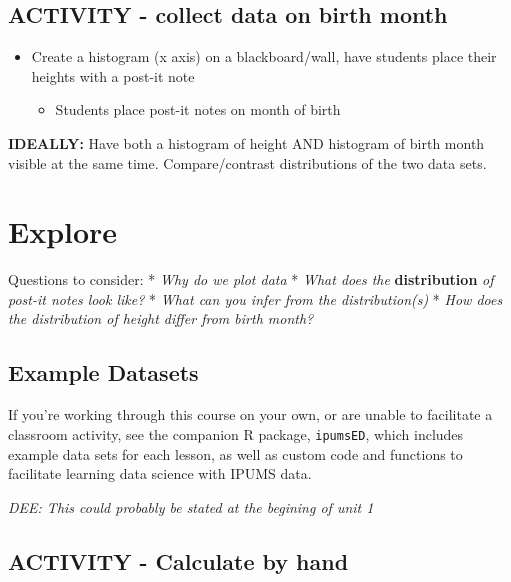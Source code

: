 \documentclass[
]{book}
\providecommand{\tightlist}{%
  \setlength{\itemsep}{0pt}\setlength{\parskip}{0pt}}
\begin{document}
\hypertarget{activity---collect-data-on-birth-month}{%
\subsection{ACTIVITY - collect data on birth month}\label{activity---collect-data-on-birth-month}}

\begin{itemize}
\tightlist
\item
  Create a histogram (x axis) on a blackboard/wall, have students place their heights
  with a post-it note

  \begin{itemize}
  \tightlist
  \item
    Students place post-it notes on month of birth
  \end{itemize}
\end{itemize}

\textbf{IDEALLY:} Have both a histogram of height AND histogram of birth month visible
at the same time. Compare/contrast distributions of the two data sets.

\hypertarget{explore-5}{%
\section{Explore}\label{explore-5}}

Questions to consider:
* \emph{Why do we plot data}
* \emph{What does the} \textbf{distribution} \emph{of post-it notes look like?}
* \emph{What can you infer from the distribution(s)}
* \emph{How does the distribution of height differ from birth month?}

\hypertarget{example-datasets}{%
\subsection{Example Datasets}\label{example-datasets}}

If you're working through this course on your own, or are unable to facilitate a classroom activity, see the companion R package, \texttt{ipumsED}, which includes example data sets for each lesson, as well as custom code and functions to facilitate learning data science with IPUMS data.

\emph{DEE: This could probably be stated at the begining of unit 1}

\hypertarget{activity---calculate-by-hand}{%
\subsection{ACTIVITY - Calculate by hand}\label{activity---calculate-by-hand}}
\end{document}
